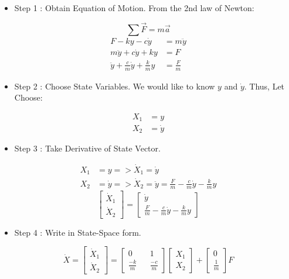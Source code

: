 \begin{itemize}
	\item Step 1 : Obtain Equation of Motion. From the 2nd law of Newton:
\end{itemize}
\[
\sum \vec{F} = m\vec{a}
\]
\[
\begin{split}
	F - ky - c \dot{y} &= m \ddot{y} \\
	m \ddot{y} + c \dot{y} + ky &= F \\
	\ddot{y} + \frac{c}{m} \dot{y} + \frac{k}{m} y &= \frac{F}{m}
\end{split}
\]
\begin{itemize}
	\item Step 2 : Choose State Variables. We would like to know \(y\) and \(\dot{y}\). Thus, Let Choose:
\end{itemize}
\[
\begin{split}
	X_1 &= y \\
	X_2 &= \dot{y}
\end{split}
\]
\begin{itemize}
	\item Step 3 : Take Derivative of State Vector.
\end{itemize}
\[
\begin{split}
	X_1 &= y => \dot{X}_1 = \dot{y}\\
	X_2 &= \dot{y} => \dot{X}_2 = \ddot{y} = \frac{F}{m} - \frac{c}{m} \dot{y} - \frac{k}{m} y
\end{split}
\]
\[
\begin{bmatrix}
	\dot{X}_1 \\
	\dot{X}_2 
\end{bmatrix} =
\begin{bmatrix}
	\dot{y}                                           \\
	\frac{F}{m} - \frac{c}{m} \dot{y} - \frac{k}{m} y 
\end{bmatrix}
\]
\begin{itemize}
	\item Step 4 : Write in State-Space form.
\end{itemize}
\[
\dot{X} = 
\begin{bmatrix}
	\dot{X}_1 \\
	\dot{X}_2 
\end{bmatrix} =
\begin{bmatrix}
	0            &   & 1            \\
	\frac{-k}{m} &   & \frac{-c}{m} 
\end{bmatrix}
\begin{bmatrix}
	X_1 \\
	X_2 
\end{bmatrix} +
\begin{bmatrix}
	0           \\
	\frac{1}{m} 
\end{bmatrix} F
\]

